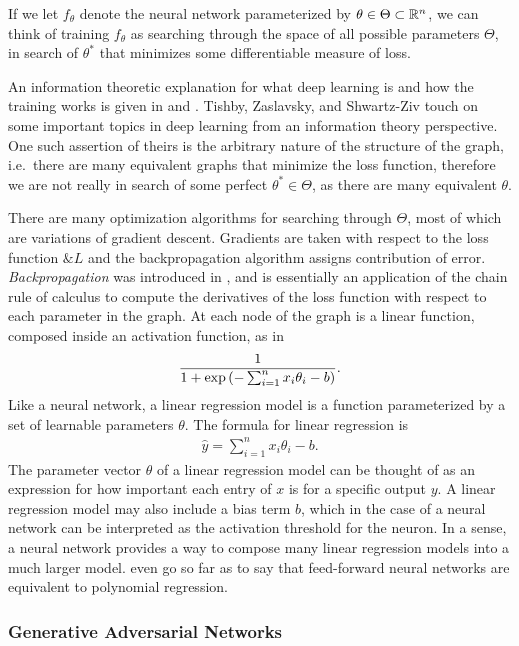 If we let $f_\theta$ denote the neural network parameterized by $\theta \in
\Theta \subset \mathbb{R}^n$, we can think of training $f_\theta$ as searching through
the space of all possible parameters $\Theta$, in search of $\theta^*$ that
minimizes some differentiable measure of loss.

An information theoretic explanation for what deep learning is and how the
training works is given in \cite{ref:tishby-2015} and \cite{ref:tishby-2017}.
Tishby, Zaslavsky, and Shwartz-Ziv touch on some important topics in deep
learning from an information theory perspective. One such assertion of theirs is
the arbitrary nature of the structure of the graph, i.e.\ there are many
equivalent graphs that minimize the loss function, therefore we are not really
in search of some perfect $\theta^* \in \Theta$, as there are many equivalent
$\theta$.

There are many optimization algorithms for searching through $\Theta$, most of
which are variations of gradient descent. Gradients are taken with respect to
the loss function $\&L$ and the backpropagation algorithm assigns contribution
of error. \textit{Backpropagation} was introduced in \cite{ref:rumelhart-1986},
and is essentially an application of the chain rule of calculus to compute the
derivatives of the loss function with respect to each parameter in the graph. At
each node of the graph is a linear function, composed inside an activation
function, as in
\begin{align}
{1 \over 1 + \exp{\left(- \sum_{i = 1}^n x_i\theta_i - b \right)}}.
\end{align}
Like a neural network, a linear regression model is a function parameterized by
a set of learnable parameters $\theta$. The formula for linear regression is
\begin{align}
  \label{eq:lin-reg} \hat{y} = \sum_{i=1}^n x_i\theta_i - b.
\end{align}
The parameter vector $\theta$ of a linear regression model can be thought of as
an expression for how important each entry of $x$ is for a specific output $y$.
A linear regression model may also include a bias term $b$, which in the case of
a neural network can be interpreted as the activation threshold for the neuron.
In a sense, a neural network provides a way to compose many linear regression
models into a much larger model. \cite{ref:cheng-2018} even go so far as to say
that feed-forward neural networks are equivalent to polynomial regression.

\subsubsection*{Generative Adversarial Networks}

